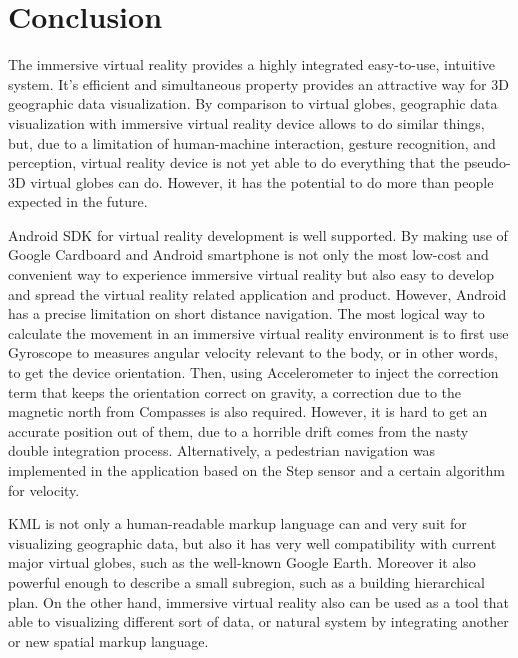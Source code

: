 \chapter{Conclusion}
\label{chapter-conclusion}

The immersive virtual reality provides a highly integrated easy-to-use, intuitive system. It's efficient and simultaneous property provides an attractive way for 3D geographic data visualization. By comparison to virtual globes, geographic data visualization with immersive virtual reality device allows to do similar things, but, due to a limitation of human-machine interaction, gesture recognition, and perception, virtual reality device is not yet able to do everything that the pseudo-3D virtual globes can do. However, it has the potential to do more than people expected in the future.

Android SDK for virtual reality development is well supported. By making use of Google Cardboard and Android smartphone is not only the most low-cost and convenient way to experience immersive virtual reality but also easy to develop and spread the virtual reality related application and product. However, Android has a precise limitation on short distance navigation. The most logical way to calculate the movement in an immersive virtual reality environment is to first use Gyroscope to measures angular velocity relevant to the body, or in other words, to get the device orientation. Then, using Accelerometer to inject the correction term that keeps the orientation correct on gravity, a correction due to the magnetic north from Compasses is also required. However, it is hard to get an accurate position out of them, due to a horrible drift comes from the nasty double integration process. Alternatively, a pedestrian navigation was implemented in the application based on the Step sensor and a certain algorithm for velocity.

KML is not only a human-readable markup language can and very suit for visualizing geographic data, but also it has very well compatibility with current major virtual globes, such as the well-known Google Earth. Moreover it also powerful enough to describe a small subregion, such as a building hierarchical plan. On the other hand, immersive virtual reality also can be used as a tool that able to visualizing different sort of data, or natural system by integrating another or new spatial markup language.

